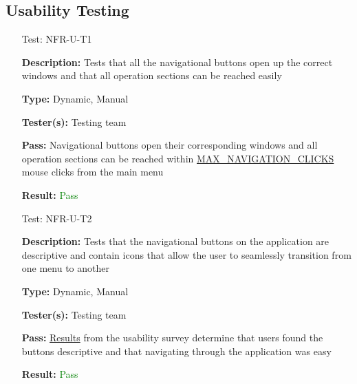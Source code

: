 \documentclass[12pt, titlepage]{article}
\begin{document}
\subsection{Usability Testing}
\begin{enumerate}

\item[Test:]{NFR-U-T1\\}

\textbf{Description:} Tests that all the navigational buttons open up the correct windows and that all operation sections can be reached easily

\textbf{Type:} Dynamic, Manual
					
\textbf{Tester(s):} Testing team
					
\textbf{Pass:} Navigational buttons open their corresponding windows and all operation sections can be reached within \hyperref[sec:sp]{MAX\_NAVIGATION\_CLICKS} mouse clicks from the main menu
					
\textbf{Result:} \textcolor{Green}{Pass}

\item[Test:]{NFR-U-T2\\}

\textbf{Description:} Tests that the navigational buttons on the application are descriptive and contain icons that allow the user to seamlessly transition from one menu to another

\textbf{Type:} Dynamic, Manual
					
\textbf{Tester(s):} Testing team
					
\textbf{Pass:} \hyperref[sec:surveyR]{Results} from the usability survey determine that users found the buttons descriptive and that navigating through the application was easy
					
\textbf{Result:} \textcolor{Green}{Pass}


\end{enumerate}
\end{document}
